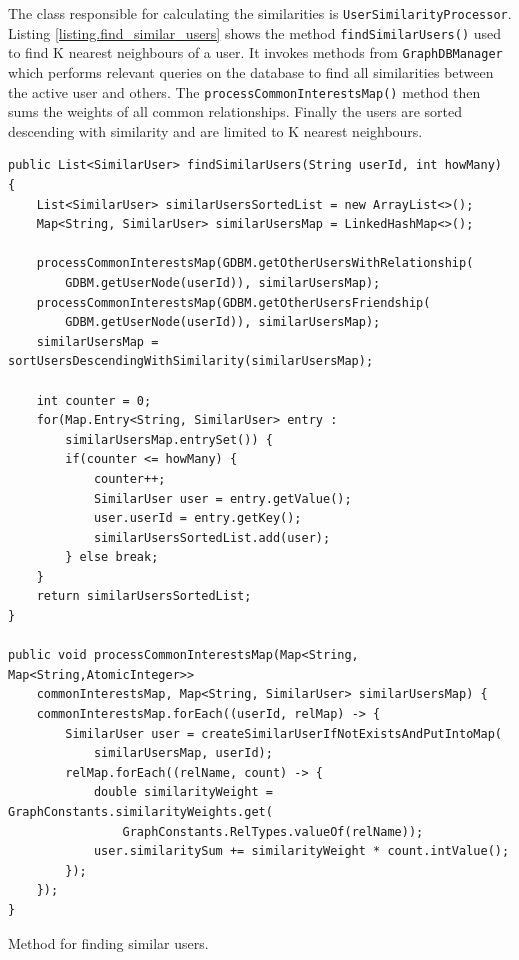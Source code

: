 \documentclass[12pt]{report}
\begin{document}
The class responsible for calculating the similarities is \texttt{User\-Similarity\-Processor}. Listing \ref{listing.find_similar_users} shows the method \texttt{find\-Similar\-Users()} used to find K nearest neighbours of a user. It invokes methods from \texttt{GraphDB\-Manager} which performs relevant queries on the database to find all similarities between the active user and others. The \texttt{process\-Common\-Interests\-Map()} method then sums the weights of all common relationships. Finally the users are sorted descending with similarity and are limited to K nearest neighbours.

\begin{listing}[!h]
\begin{verbatim}
public List<SimilarUser> findSimilarUsers(String userId, int howMany) {
    List<SimilarUser> similarUsersSortedList = new ArrayList<>();
    Map<String, SimilarUser> similarUsersMap = LinkedHashMap<>();

    processCommonInterestsMap(GDBM.getOtherUsersWithRelationship(
        GDBM.getUserNode(userId)), similarUsersMap);
    processCommonInterestsMap(GDBM.getOtherUsersFriendship(
        GDBM.getUserNode(userId)), similarUsersMap);
    similarUsersMap = sortUsersDescendingWithSimilarity(similarUsersMap);

    int counter = 0;
    for(Map.Entry<String, SimilarUser> entry : 
        similarUsersMap.entrySet()) {
        if(counter <= howMany) {
            counter++;
            SimilarUser user = entry.getValue();
            user.userId = entry.getKey();
            similarUsersSortedList.add(user);
        } else break;
    }
    return similarUsersSortedList;
}

public void processCommonInterestsMap(Map<String, Map<String,AtomicInteger>>
    commonInterestsMap, Map<String, SimilarUser> similarUsersMap) {
    commonInterestsMap.forEach((userId, relMap) -> {
        SimilarUser user = createSimilarUserIfNotExistsAndPutIntoMap(
            similarUsersMap, userId);
        relMap.forEach((relName, count) -> {
            double similarityWeight = GraphConstants.similarityWeights.get(
                GraphConstants.RelTypes.valueOf(relName));
            user.similaritySum += similarityWeight * count.intValue();
        });
    });
}
\end{verbatim}
\caption{Method for finding similar users.}
\label{listing.find_similar_users}
\end{listing}
\end{document}
